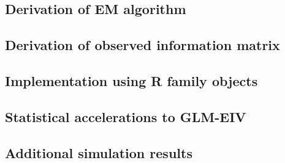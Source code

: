 \documentclass[12pt]{article}
\begin{document}


 

 
\subsection{Derivation of EM algorithm}

\subsection{Derivation of observed information matrix}

\subsection{Implementation using R family objects}

\subsection{Statistical accelerations to GLM-EIV}

\subsection{Additional simulation results}



\newpage

\end{document}
